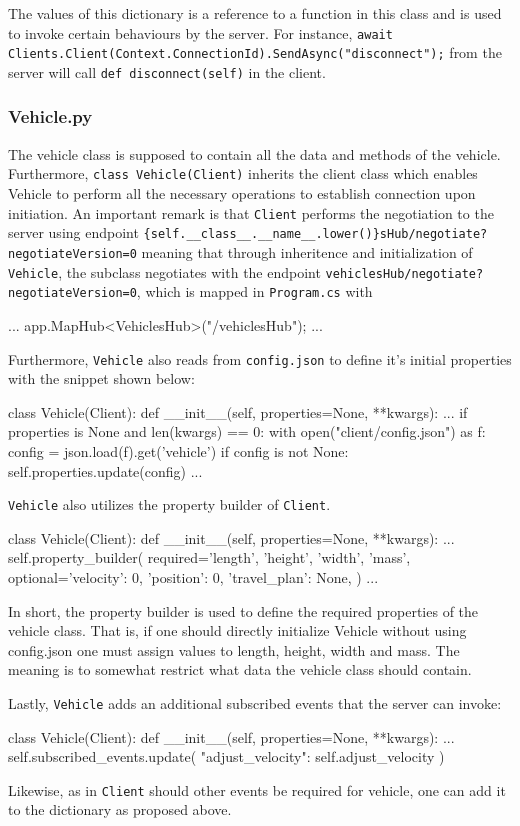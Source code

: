 The values of this dictionary is a reference to a function in this class and is used to invoke certain behaviours by the server. For instance, \newline\verb|await Clients.Client(Context.ConnectionId).SendAsync("disconnect");| from the server will call \verb|def disconnect(self)| in the client. 

\subsubsection{Vehicle.py}
The vehicle class is supposed to contain all the data and methods of the vehicle. Furthermore, \verb|class Vehicle(Client)| inherits the client class which enables Vehicle to perform all the necessary operations to establish connection upon initiation. An important remark is that \verb|Client| performs the negotiation to the server using endpoint \newline \verb|{self.__class__.__name__.lower()}sHub/negotiate?negotiateVersion=0| meaning that through inheritence and initialization of \verb|Vehicle|, the subclass negotiates with the endpoint  \verb|vehiclesHub/negotiate?negotiateVersion=0|, which is mapped in \verb|Program.cs| with
\begin{csharp}
...
app.MapHub<VehiclesHub>("/vehiclesHub");
...
\end{csharp}

Furthermore, \verb|Vehicle| also reads from \verb|config.json| to define it's initial properties with the snippet shown below:
\begin{python}
class Vehicle(Client):
	def __init__(self, properties=None, **kwargs):
		...
		if properties is None and len(kwargs) == 0:
			with open("client/config.json") as f:
				config = json.load(f).get('vehicle')
				if config is not None:
					self.properties.update(config)
		...
\end{python}

\verb|Vehicle| also utilizes the property builder of \verb|Client|.

\begin{python}
class Vehicle(Client):
	def __init__(self, properties=None, **kwargs):
		...
		self.property_builder(
			required={'length', 'height', 'width', 'mass'},
			optional={'velocity': 0, 'position': 0, 'travel_plan': None},
		)
		...
\end{python}

In short, the property builder is used to define the required properties of the vehicle class. That is, if one should directly initialize Vehicle without using config.json one must assign values to length, height, width and mass. The meaning is to somewhat restrict what data the vehicle class should contain.

Lastly, \verb|Vehicle| adds an additional subscribed events that the server can invoke:
\begin{python}
class Vehicle(Client):
	def __init__(self, properties=None, **kwargs):
		...
		self.subscribed_events.update({
			"adjust_velocity": self.adjust_velocity
		})
\end{python}

Likewise, as in \verb|Client| should other events be required for vehicle, one can add it to the dictionary as proposed above.